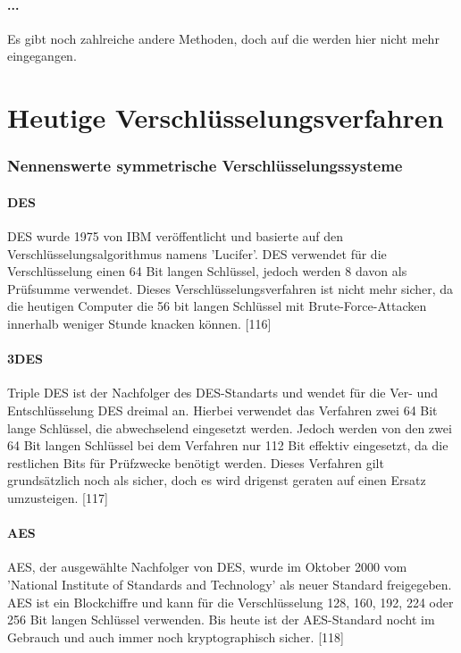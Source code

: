 \documentclass[12pt,a4paper]{report}
\begin{document}
\begin{onehalfspace}
\paragraph{...} Es gibt noch zahlreiche andere Methoden, doch auf die werden hier nicht mehr eingegangen. 

\section{Heutige Verschlüsselungsverfahren}

\subsubsection{Nennenswerte symmetrische Verschlüsselungssysteme}

\paragraph{DES}

DES wurde 1975 von IBM veröffentlicht und basierte auf den Verschlüsselungsalgorithmus namens 'Lucifer'. DES verwendet für die Verschlüsselung einen 64 Bit langen Schlüssel, jedoch werden 8 davon als Prüfsumme verwendet. Dieses Verschlüsselungsverfahren ist nicht mehr sicher, da die heutigen Computer die 56 bit langen Schlüssel mit Brute-Force-Attacken innerhalb weniger Stunde knacken können. [116]

\paragraph{3DES}

Triple DES ist der Nachfolger des DES-Standarts und wendet für die Ver- und Entschlüsselung DES dreimal an. Hierbei verwendet das Verfahren zwei 64 Bit lange Schlüssel, die abwechselend eingesetzt werden. Jedoch werden von den zwei 64 Bit langen Schlüssel bei dem Verfahren nur 112 Bit effektiv eingesetzt, da die restlichen Bits für Prüfzwecke benötigt werden. Dieses Verfahren gilt grundsätzlich noch als sicher, doch es wird drigenst geraten auf einen Ersatz umzusteigen. [117]

\paragraph{AES}

AES, der ausgewählte Nachfolger von DES, wurde im Oktober 2000 vom 'National Institute of Standards and Technology' als neuer Standard freigegeben. AES ist ein Blockchiffre und kann für die Verschlüsselung 128, 160, 192, 224 oder 256 Bit langen Schlüssel verwenden. Bis heute ist der AES-Standard nocht im Gebrauch und auch immer noch kryptographisch sicher. [118]


\end{onehalfspace}
\end{document}
